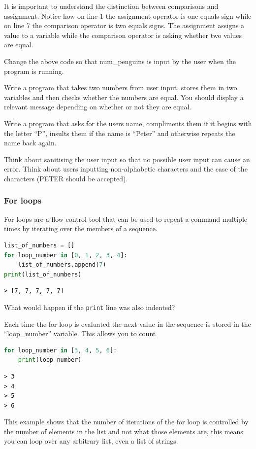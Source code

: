It is important to understand the distinction between comparisons and assignment. Notice how on line 1 the assignment operator is one equals sign while on line 7 the comparison operator is two equals signs. The assignment assigns a value to a variable while the comparison operator is asking whether two values are equal.
		\begin{task}Change the above code so that num\_penguins is input by the user when the program is running.\end{task}
		\begin{task}Write a program that takes two numbers from user input, stores them in two variables and then checks whether the numbers are equal. You should display a relevant message depending on whether or not they are equal.\end{task}
		\begin{task} Write a program that asks for the users name, compliments them if it begins with the letter ``P'', insults them if the name is ``Peter'' and otherwise repeats the name back again.\end{task}
		\begin{advancedtask}Think about sanitising the user input so that no possible user input can cause an error. Think about users inputting non-alphabetic characters and the case of the characters (PETER should be accepted).\end{advancedtask}


		\subsubsection{For loops}
		For loops are a flow control tool that can be used to repeat a command multiple times by iterating over the members of a sequence.
		\begin{lstlisting}[language=Python]
list_of_numbers = []
for loop_number in [0, 1, 2, 3, 4]:
	list_of_numbers.append(7)
print(list_of_numbers)\end{lstlisting}
		\begin{verbatim}> [7, 7, 7, 7, 7]\end{verbatim}

		\begin{task}What would happen if the \texttt{print} line was also indented?\end{task}
		Each time the for loop is evaluated the next value in the sequence is stored in the ``loop\_number'' variable. This allows you to count
		\begin{lstlisting}[language=Python]
for loop_number in [3, 4, 5, 6]:
	print(loop_number)\end{lstlisting}
\begin{verbatim}
> 3
> 4
> 5
> 6
\end{verbatim}
		This example shows that the number of iterations of the for loop is controlled by the number of elements in the list and not what those elements are, this means you can loop over any arbitrary list, even a list of strings.


